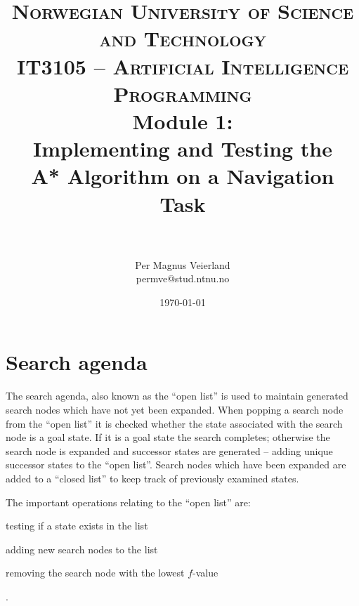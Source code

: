 

\usepackage{float}

\title{
\normalfont \normalsize
\textsc{Norwegian University of Science and Technology\\IT3105 -- Artificial Intelligence Programming}
\horrule{0.5pt} \\[0.4cm]
\huge Module 1:\\Implementing and Testing the\\A* Algorithm on a Navigation Task\\
\horrule{2pt} \\[0.5cm]
}

\author{Per Magnus Veierland\\permve@stud.ntnu.no}

\date{\normalsize\today}




\fancyfoot[C]{}
\maketitle

\newpage
{} %
\setcounter{page}{1}

\section*{Search agenda}

The search agenda, also known as the ``open list'' is used to maintain generated search nodes which have not yet been expanded. When popping a search node from the ``open list'' it is checked whether the state associated with the search node is a goal state. If it is a goal state the search completes; otherwise the search node is expanded and successor states are generated -- adding unique successor states to the ``open list''. Search nodes which have been expanded are added to a ``closed list'' to keep track of previously examined states.

The important operations relating to the ``open list'' are:
\begin{enumerate*}
\item testing if a state exists in the list
\item adding new search nodes to the list
\item removing the search node with the lowest $f$-value
\end{enumerate*}.

